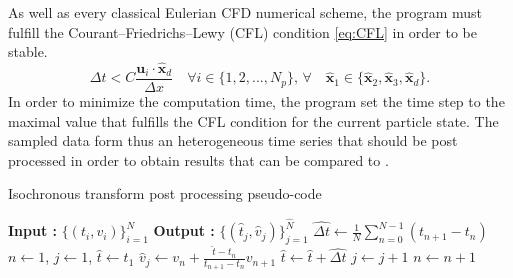 As well as every classical Eulerian CFD numerical scheme, the program must fulfill the Courant–Friedrichs–Lewy (CFL) condition \eqref{eq:CFL} in order to be stable. 
\begin{equation}
	\Delta t < C\frac{\textbf{u}_i\cdot \hat{\textbf{x}}_d}{\Delta x} \quad \forall i\in\{1,2,...,N_p\},\,\forall \quad \hat{\textbf{x}}_1\in\{\hat{\textbf{x}}_2,\hat{\textbf{x}}_3,\hat{\textbf{x}}_d\}.
	\label{eq:CFL}
\end{equation}
In order to minimize the computation time, the program set the time step to the maximal value that fulfills the CFL condition for the current particle state. 
The sampled data form thus an heterogeneous time series that should be post processed in order to obtain results that can be compared to \citet{Meyer2016}.

\begin{algorithm}
	\caption{Isochronous transform post processing pseudo-code }
	\label{alg:isochronous}
	\begin{algorithmic}
		\State \textbf{Input :} $\{(t_i,v_i)\}_{i=1}^N$
		\State \textbf{Output :} $\{(\hat{t}_j,\hat{v}_j)\}_{j=1}^{\hat{N}}$
		\State $\hat{\Delta t} \gets \frac{1}{N}\sum_{n=0}^{N-1}(t_{n+1}-t_{n})$
		\State $n \gets 1$, $j \gets 1$, $\hat{t} \gets t_1$
		\State $\hat{v}_j \gets v_n + \frac{\hat{t}-t_n}{t_{n+1}-t_n} v_{n+1}$
		\State $\hat{t}\gets \hat{t} + \hat{\Delta t}$
		\State $j \gets j + 1$
		\EndWhile
		\State $n\gets n+1$
		\EndWhile
	\end{algorithmic}
\end{algorithm}

